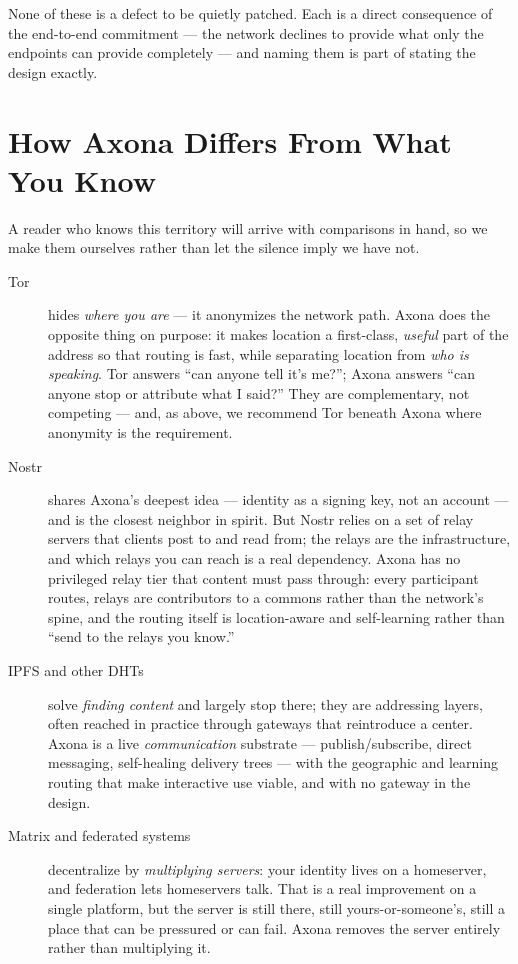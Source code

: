 \documentclass[nobib,justified]{tufte-handout}
\begin{document}
None of these is a defect to be quietly patched. Each is a direct consequence of
the end-to-end commitment --- the network declines to provide what only the
endpoints can provide completely --- and naming them is part of stating the design exactly.

\section{How Axona Differs From What You Know}

A reader who knows this territory will arrive with comparisons in hand, so we make them ourselves rather than let the silence imply we have not.

\begin{description}
\item[Tor] hides \emph{where you are} --- it anonymizes the network path. Axona
does the opposite thing on purpose: it makes location a first-class,
\emph{useful} part of the address so that routing is fast, while separating
location from \emph{who is speaking}. Tor answers ``can anyone tell it's me?'';
Axona answers ``can anyone stop or attribute what I said?'' They are
complementary, not competing --- and, as above, we recommend Tor beneath Axona
where anonymity is the requirement.

\item[Nostr] shares Axona's deepest idea --- identity as a signing key, not an
account --- and is the closest neighbor in spirit. But Nostr relies on a set of
relay servers that clients post to and read from; the relays are the
infrastructure, and which relays you can reach is a real dependency. Axona has no
privileged relay tier that content must pass through: every participant routes,
relays are contributors to a commons rather than the network's spine, and the
routing itself is location-aware and self-learning rather than ``send to the
relays you know.''

\item[IPFS and other DHTs] solve \emph{finding content} and largely stop there;
they are addressing layers, often reached in practice through gateways that
reintroduce a center. Axona is a live \emph{communication} substrate ---
publish/subscribe, direct messaging, self-healing delivery trees --- with the
geographic and learning routing that make interactive use viable, and with no
gateway in the design.

\item[Matrix and federated systems] decentralize by \emph{multiplying servers}:
your identity lives on a homeserver, and federation lets homeservers talk. That is
a real improvement on a single platform, but the server is still there, still
yours-or-someone's, still a place that can be pressured or can fail. Axona removes
the server entirely rather than multiplying it.


\end{description}
\end{document}
